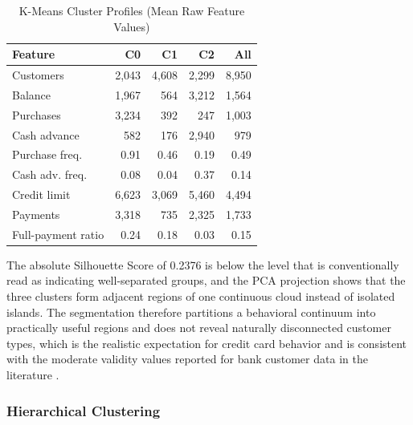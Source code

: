 \documentclass[conference]{IEEEtran}
\begin{document}
\begin{table}[!t]
\centering
\caption{K-Means Cluster Profiles (Mean Raw Feature Values)}
\label{tab:profiles}
\renewcommand{\arraystretch}{1.2}
\begin{tabular}{|l|r|r|r|r|}
\hline
\textbf{Feature} & \textbf{C0} & \textbf{C1} & \textbf{C2} & \textbf{All} \\
\hline
Customers & 2,043 & 4,608 & 2,299 & 8,950 \\
\hline
Balance & 1,967 & 564 & 3,212 & 1,564 \\
\hline
Purchases & 3,234 & 392 & 247 & 1,003 \\
\hline
Cash advance & 582 & 176 & 2,940 & 979 \\
\hline
Purchase freq. & 0.91 & 0.46 & 0.19 & 0.49 \\
\hline
Cash adv. freq. & 0.08 & 0.04 & 0.37 & 0.14 \\
\hline
Credit limit & 6,623 & 3,069 & 5,460 & 4,494 \\
\hline
Payments & 3,318 & 735 & 2,325 & 1,733 \\
\hline
Full-payment ratio & 0.24 & 0.18 & 0.03 & 0.15 \\
\hline
\end{tabular}
\end{table}

The absolute Silhouette Score of 0.2376 is below the level that is conventionally read as indicating well-separated groups, and the PCA projection shows that the three clusters form adjacent regions of one continuous cloud instead of isolated islands. The segmentation therefore partitions a behavioral continuum into practically useful regions and does not reveal naturally disconnected customer types, which is the realistic expectation for credit card behavior and is consistent with the moderate validity values reported for bank customer data in the literature \cite{aryuni2018,barkhordar2021}.

\subsubsection{Hierarchical Clustering}
\end{document}
